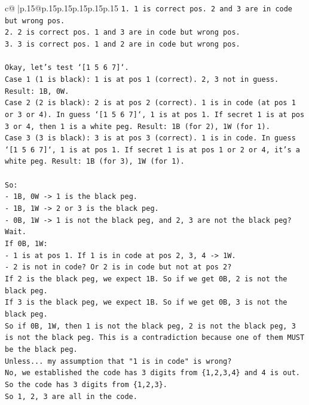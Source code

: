 \documentclass{article}
\begin{document}
{\begin{supertabular}{c@{$\;$}|p{.15\linewidth}@{}p{.15\linewidth}p{.15\linewidth}p{.15\linewidth}p{.15\linewidth}p{.15\linewidth}}
{{{\texttt{1. 1 is correct pos. 2 and 3 are in code but wrong pos.} \\
\texttt{2. 2 is correct pos. 1 and 3 are in code but wrong pos.} \\
\texttt{3. 3 is correct pos. 1 and 2 are in code but wrong pos.} \\
\\ 
\texttt{Okay, let's test `{[}1 5 6 7{]}`.} \\
\texttt{Case 1 (1 is black): 1 is at pos 1 (correct). 2, 3 not in guess. Result: 1B, 0W.} \\
\texttt{Case 2 (2 is black): 2 is at pos 2 (correct). 1 is in code (at pos 1 or 3 or 4). In guess `{[}1 5 6 7{]}`, 1 is at pos 1. If secret 1 is at pos 3 or 4, then 1 is a white peg. Result: 1B (for 2), 1W (for 1).} \\
\texttt{Case 3 (3 is black): 3 is at pos 3 (correct). 1 is in code. In guess `{[}1 5 6 7{]}`, 1 is at pos 1. If secret 1 is at pos 1 or 2 or 4, it's a white peg. Result: 1B (for 3), 1W (for 1).} \\
\\ 
\texttt{So:} \\
\texttt{{-} 1B, 0W {-}> 1 is the black peg.} \\
\texttt{{-} 1B, 1W {-}> 2 or 3 is the black peg.} \\
\texttt{{-} 0B, 1W {-}> 1 is not the black peg, and 2, 3 are not the black peg? Wait.} \\
\texttt{If 0B, 1W:} \\
\texttt{{-} 1 is at pos 1. If 1 is in code at pos 2, 3, 4 {-}> 1W.} \\
\texttt{{-} 2 is not in code? Or 2 is in code but not at pos 2?} \\
\texttt{If 2 is the black peg, we expect 1B. So if we get 0B, 2 is not the black peg.} \\
\texttt{If 3 is the black peg, we expect 1B. So if we get 0B, 3 is not the black peg.} \\
\texttt{So if 0B, 1W, then 1 is not the black peg, 2 is not the black peg, 3 is not the black peg. This is a contradiction because one of them MUST be the black peg.} \\
\texttt{Unless... my assumption that "1 is in code" is wrong?} \\
\texttt{No, we established the code has 3 digits from \{1,2,3,4\} and 4 is out. So the code has 3 digits from \{1,2,3\}.} \\
\texttt{So 1, 2, 3 are all in the code.} \\
}}}
\end{supertabular}}
\end{document}
